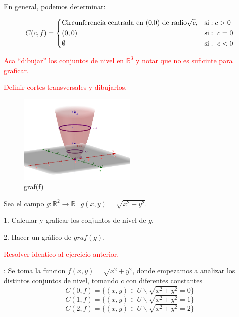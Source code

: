 \begin{definition} 
En general, podemos determinar: 

   \[
        C(c,f)=
        \begin{dcases}
           \textnormal{Circunferencia centrada en (0,0) de radio} \sqrt{c},  & \textnormal{si}:  c>0 \\
(0,0)  & \textnormal{si}:\ c=0\\
\emptyset  & \textnormal{si}:\ c<0\\
        \end{dcases}
    \]

\textcolor{red}{Aca ``dibujar'' los conjuntos de nivel en $\mathbb{R}^{3}$ y notar que no es suficinte para graficar.}  


\textcolor{red}{Definir cortes transversales y dibujarlos.}


\begin{figure}[h!] %
    \centering
    \includegraphics[width=0.5\textwidth]{../figs/conjunto1_r3.png} %
    \caption{graf(f)}
    \label{fig:ejemplo} %
\end{figure}



 

\begin{example}   Sea  el campo  $g: \mathbb{R}^{2} \rightarrow \mathbb{R} \:|\:  g(x,y) = \sqrt{x^2+y^2}.$
\end{example}
1. Calcular y graficar los conjuntos de nivel de $g$.

2. Hacer un gr\'afico de  $graf(g)$.


\textcolor{red}{Resolver identico al ejercicio  anterior.}  



: Se toma la funcion $f(x,y)=\sqrt{x^2+y^2}$, donde empezamos a analizar los distintos conjuntos de nivel, tomando $c$ con diferentes constantes
 \[
C(0,f)=\{(x,y) \in U \backslash \sqrt{x^2+y^2}=0 \}
\]
 \[
C(1,f)=\{(x,y) \in U \backslash \sqrt{x^2+y^2}=1 \}
\]
 \[
C(2,f)=\{(x,y) \in U \backslash \sqrt{x^2+y^2}=2 \}
 \]


\end{definition}
